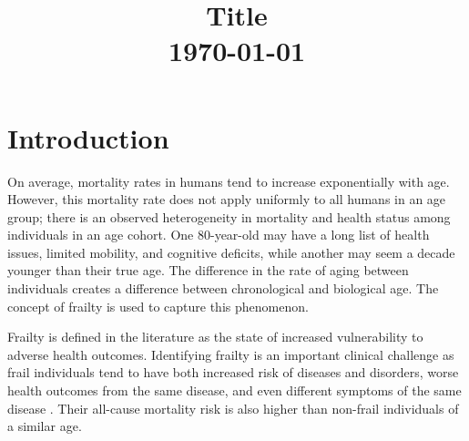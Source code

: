 \documentclass[11pt]{amsart}
\begin{document}
\title[Aging]{ Title \\ \today }



\maketitle
\begin{abstract}
	 
\end{abstract} 

\tableofcontents

\newpage

\section{Introduction}

On average, mortality rates in humans tend to increase exponentially with age. However, this mortality rate does not apply uniformly to all humans in an age group; there is an observed heterogeneity in mortality and health status among individuals in an age cohort. One 80-year-old may have a long list of health issues, limited mobility, and cognitive deficits, while another may seem a decade younger than their true age. The difference in the rate of aging between individuals creates a difference between chronological and biological age. The concept of frailty is used to capture this phenomenon.
 
Frailty is defined in the literature as the state of increased vulnerability to adverse health outcomes. Identifying frailty is an important clinical challenge as frail individuals tend to have both increased risk of diseases and disorders, worse health outcomes from the same disease, and even different symptoms of the same disease \citep{whitehead2014clinical}. Their all-cause mortality risk is also higher than non-frail individuals of a similar age.
 
\end{document}
